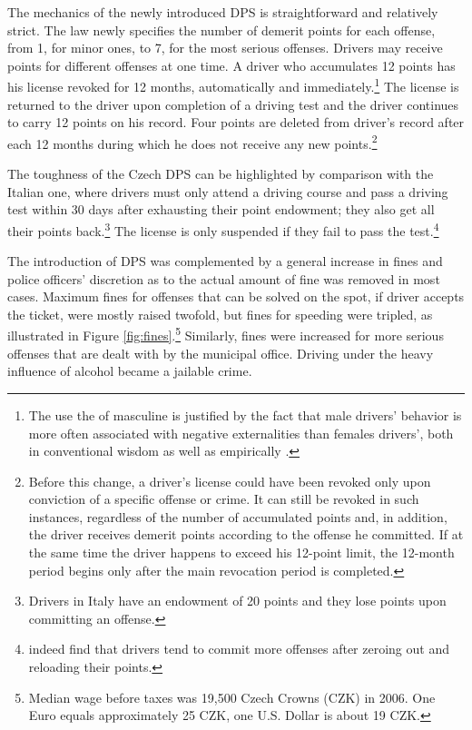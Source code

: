 \documentclass[12pt]{article}
\begin{document}
The mechanics of the newly introduced DPS is straightforward and relatively
strict. The law newly specifies the number of demerit points for each offense,
from 1, for minor ones, to 7, for the most serious offenses. Drivers may receive
points for different offenses at one time. A driver who accumulates 12 points
has his license revoked for 12 months, automatically and
immediately.\footnote{The use the of masculine is justified by the fact that
  male drivers' behavior is more often associated with negative externalities
  than females drivers', both in conventional wisdom as well as empirically
  \citep{chipman_role_1975,steven_d._levitt_dangerous_2001,redelmeier_traffic-law_2003}.}
The license is returned to the driver upon completion of a driving test and the
driver continues to carry 12 points on his record. Four points are deleted from
driver's record after each 12 months during which he does not receive any new
points.\footnote{Before this change, a driver's license could have been revoked
  only upon conviction of a specific offense or crime.  It can still be revoked
  in such instances, regardless of the number of accumulated points and, in
  addition, the driver receives demerit points according to the offense he
  committed. If at the same time the driver happens to exceed his 12-point
  limit, the 12-month period begins only after the main revocation period is
  completed.} 
  
The toughness of the Czech DPS can be highlighted by comparison with the Italian
one, where drivers must only attend a driving course and pass a driving test
within 30 days after exhausting their point endowment; they also get all their
points back.\footnote{Drivers in Italy have an endowment of 20 points and they
  lose points upon committing an offense.} The license is only suspended if
they fail to pass the test.\footnote{\citet{nicita_warning_2012} indeed find
  that drivers tend to commit more offenses after zeroing out and reloading
  their points.}

The introduction of DPS was complemented by a general increase in fines and
police officers' discretion as to the actual amount of fine was removed in most
cases.  Maximum fines for offenses that can be solved on the spot, if driver
accepts the ticket, were mostly raised twofold, but fines for speeding were
tripled, as illustrated in Figure \ref{fig:fines}.\footnote{Median wage before
  taxes was 19,500 Czech Crowns (CZK) in 2006. One Euro equals approximately 25
  CZK, one U.S. Dollar is about 19 CZK.} Similarly, fines were increased for 
more serious offenses that are dealt with by the municipal office.  Driving
under the heavy influence of alcohol became a jailable crime.
\end{document}
